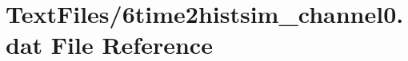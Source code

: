 \hypertarget{6time2histsim__channel0_8dat}{}\section{Text\+Files/6time2histsim\+\_\+channel0.dat File Reference}
\label{6time2histsim__channel0_8dat}
